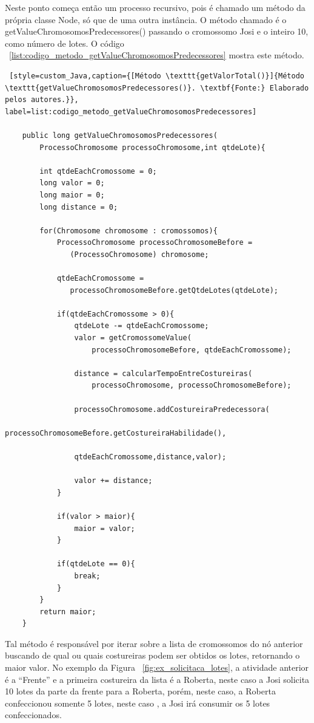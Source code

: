 \par Neste ponto começa então um processo recursivo, pois é chamado um método da
própria classe Node, só que de uma outra instância. O método chamado é o getValueChromosomosPredecessores() 
passando o cromossomo Josi e o inteiro 10, como número de lotes. O código ~\ref{list:codigo_metodo_getValueChromosomosPredecessores} 
mostra este método.


\begin{lstlisting} [style=custom_Java,caption={[Método \texttt{getValorTotal()}]{Método \texttt{getValueChromosomosPredecessores()}. \textbf{Fonte:} Elaborado pelos autores.}}, label=list:codigo_metodo_getValueChromosomosPredecessores] 	

	public long getValueChromosomosPredecessores(
		ProcessoChromosome processoChromosome,int qtdeLote){
	
		int qtdeEachCromossome = 0;
		long valor = 0;
		long maior = 0;
		long distance = 0;
		
		for(Chromosome chromosome : cromossomos){
			ProcessoChromosome processoChromosomeBefore =
			   (ProcessoChromosome) chromosome;
			
			qtdeEachCromossome =
			   processoChromosomeBefore.getQtdeLotes(qtdeLote);
			
			if(qtdeEachCromossome > 0){
				qtdeLote -= qtdeEachCromossome;
				valor = getCromossomeValue(
					processoChromosomeBefore, qtdeEachCromossome);
					
				distance = calcularTempoEntreCostureiras(
					processoChromosome, processoChromosomeBefore);
				
				processoChromosome.addCostureiraPredecessora(
					processoChromosomeBefore.getCostureiraHabilidade(), 
					
				qtdeEachCromossome,distance,valor);
				
				valor += distance;
			}
			
			if(valor > maior){
				maior = valor;
			}
			
			if(qtdeLote == 0){
				break;
			}
		}
		return maior;
	}	
\end{lstlisting}

\par Tal método é responsável por iterar sobre a lista de cromossomos do nó anterior buscando de qual ou quais costureiras 
podem ser obtidos os lotes, retornando o maior valor. No exemplo da Figura ~\ref{fig:ex_solicitaca_lotes}, a atividade anterior é a ``Frente'' e a primeira costureira da lista é a Roberta, neste caso a Josi solicita 10 lotes da parte da frente para a Roberta, porém, 
neste caso, a Roberta confeccionou somente 5 lotes, neste caso , a Josi irá consumir os 5 lotes confeccionados.


